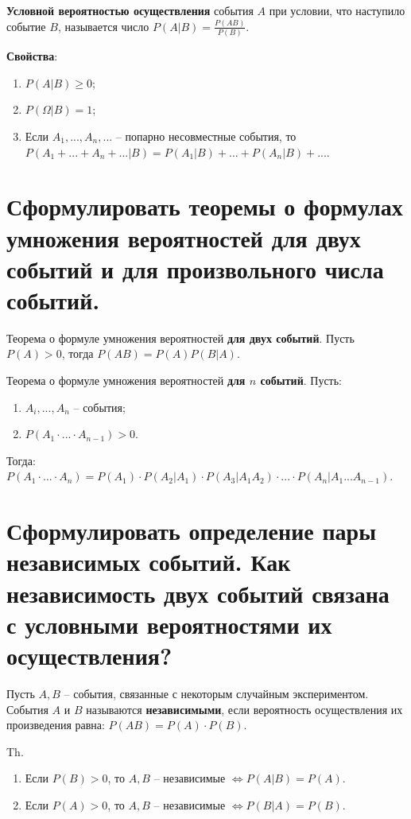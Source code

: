 \textbf{Условной вероятностью осуществления} события $A$ при условии, что наступило событие $B$, называется число $P(A | B) = \frac{P(AB)}{P(B)}$.

\textbf{Свойства}:
\begin{enumerate}
	\item $P(A|B) \geq 0$;
	\item $P(\Omega | B) = 1$;
	\item Если $A_1, ..., A_n, ...$ -- попарно несовместные события, то $P(A_1 + ... + A_n + ... | B) = P(A_1 | B) + ... + P(A_n | B) + ...$.
\end{enumerate}

\section{Сформулировать теоремы о формулах умножения вероятностей для двух событий и для произвольного числа событий.}

Теорема о формуле умножения вероятностей \textbf{для двух событий}. Пусть $P(A) > 0$, тогда $P(AB) = P(A)P(B|A)$.

Теорема о формуле умножения вероятностей \textbf{для $n$ событий}. Пусть:
\begin{enumerate}
	\item $A_i, ..., A_n$ -- события;
	\item $P(A_1 \cdot ... \cdot A_{n-1}) > 0$.
\end{enumerate}

Тогда: $P(A_1 \cdot ... \cdot A_n) = P(A_1) \cdot P(A_2 | A_1) \cdot P(A_3 | A_1A_2) \cdot ... \cdot P(A_{n} | A_1 ... A_{n-1})$.

\section{Сформулировать определение пары независимых событий. Как независимость двух событий связана с условными вероятностями их осуществления?}

Пусть $A, B$ -- события, связанные с некоторым случайным экспериментом. События $A$ и $B$ называются \textbf{независимыми}, если вероятность осуществления их произведения равна: $P(AB) = P(A) \cdot P(B)$.

Th.
\begin{enumerate}
	\item Если $P(B)>0$, то $A, B$ -- независимые $\Leftrightarrow P(A|B) = P(A)$.
	\item Если $P(A)>0$, то $A, B$ -- независимые $\Leftrightarrow P(B|A) = P(B)$.
\end{enumerate}

